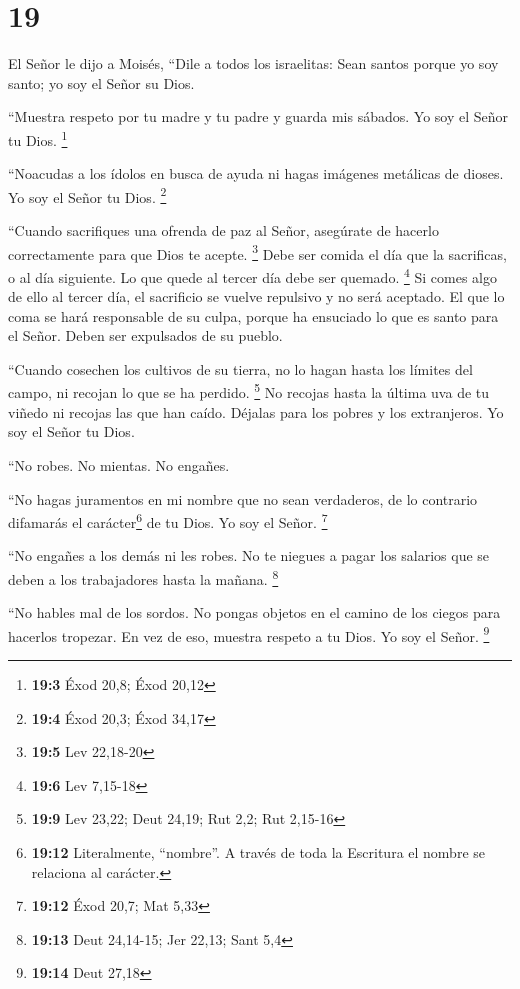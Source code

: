 \hypertarget{section-18}{%
\section{19}\label{section-18}}

 El Señor le dijo a Moisés,  ``Dile a todos
los israelitas: Sean santos porque yo soy santo; yo soy el Señor su
Dios.

 ``Muestra respeto por tu madre y tu padre y guarda mis
sábados. Yo soy el Señor tu Dios. \footnote{\textbf{19:3} Éxod 20,8;
  Éxod 20,12}

 ``Noacudas a los ídolos en busca de ayuda ni hagas
imágenes metálicas de dioses. Yo soy el Señor tu Dios. \footnote{\textbf{19:4}
  Éxod 20,3; Éxod 34,17}

 ``Cuando sacrifiques una ofrenda de paz al Señor,
asegúrate de hacerlo correctamente para que Dios te acepte. \footnote{\textbf{19:5}
  Lev 22,18-20}  Debe ser comida el día que la sacrificas,
o al día siguiente. Lo que quede al tercer día debe ser quemado.
\footnote{\textbf{19:6} Lev 7,15-18}  Si comes algo de
ello al tercer día, el sacrificio se vuelve repulsivo y no será
aceptado.  El que lo coma se hará responsable de su culpa,
porque ha ensuciado lo que es santo para el Señor. Deben ser expulsados
de su pueblo.

 ``Cuando cosechen los cultivos de su tierra, no lo hagan
hasta los límites del campo, ni recojan lo que se ha perdido.
\footnote{\textbf{19:9} Lev 23,22; Deut 24,19; Rut 2,2; Rut 2,15-16}
 No recojas hasta la última uva de tu viñedo ni recojas
las que han caído. Déjalas para los pobres y los extranjeros. Yo soy el
Señor tu Dios.

 ``No robes. No mientas. No engañes.

 ``No hagas juramentos en mi nombre que no sean
verdaderos, de lo contrario difamarás el carácter\footnote{\textbf{19:12}
  Literalmente, ``nombre''. A través de toda la Escritura el nombre se
  relaciona al carácter.} de tu Dios. Yo soy el Señor. \footnote{\textbf{19:12}
  Éxod 20,7; Mat 5,33}

 ``No engañes a los demás ni les robes. No te niegues a
pagar los salarios que se deben a los trabajadores hasta la mañana.
\footnote{\textbf{19:13} Deut 24,14-15; Jer 22,13; Sant 5,4}

 ``No hables mal de los sordos. No pongas objetos en el
camino de los ciegos para hacerlos tropezar. En vez de eso, muestra
respeto a tu Dios. Yo soy el Señor. \footnote{\textbf{19:14} Deut 27,18}

